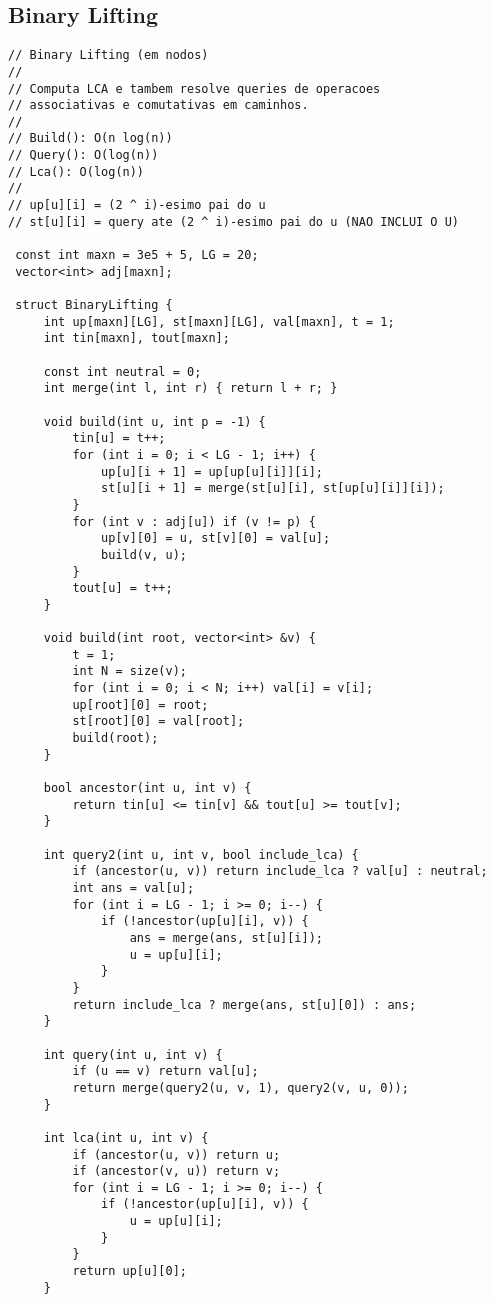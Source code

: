 \documentclass[11pt, a4paper, twoside]{article}
\begin{document}
\subsection{Binary Lifting}
\begin{lstlisting}
// Binary Lifting (em nodos)
//
// Computa LCA e tambem resolve queries de operacoes
// associativas e comutativas em caminhos.
//
// Build(): O(n log(n))
// Query(): O(log(n))
// Lca(): O(log(n))
//
// up[u][i] = (2 ^ i)-esimo pai do u
// st[u][i] = query ate (2 ^ i)-esimo pai do u (NAO INCLUI O U)

 const int maxn = 3e5 + 5, LG = 20;
 vector<int> adj[maxn];
 
 struct BinaryLifting {
     int up[maxn][LG], st[maxn][LG], val[maxn], t = 1;
     int tin[maxn], tout[maxn];
 
     const int neutral = 0;
     int merge(int l, int r) { return l + r; }
 
     void build(int u, int p = -1) {
         tin[u] = t++;
         for (int i = 0; i < LG - 1; i++) {
             up[u][i + 1] = up[up[u][i]][i];
             st[u][i + 1] = merge(st[u][i], st[up[u][i]][i]);
         }
         for (int v : adj[u]) if (v != p) {
             up[v][0] = u, st[v][0] = val[u];
             build(v, u);
         }
         tout[u] = t++;
     }
 
     void build(int root, vector<int> &v) {
         t = 1;
         int N = size(v);
         for (int i = 0; i < N; i++) val[i] = v[i];
         up[root][0] = root;
         st[root][0] = val[root];
         build(root);
     }
 
     bool ancestor(int u, int v) {
         return tin[u] <= tin[v] && tout[u] >= tout[v];
     }
 
     int query2(int u, int v, bool include_lca) {
         if (ancestor(u, v)) return include_lca ? val[u] : neutral;
         int ans = val[u];
         for (int i = LG - 1; i >= 0; i--) {
             if (!ancestor(up[u][i], v)) {
                 ans = merge(ans, st[u][i]);
                 u = up[u][i];
             }
         }
         return include_lca ? merge(ans, st[u][0]) : ans;
     }
 
     int query(int u, int v) { 
         if (u == v) return val[u];
         return merge(query2(u, v, 1), query2(v, u, 0));
     }
 
     int lca(int u, int v) {
         if (ancestor(u, v)) return u;
         if (ancestor(v, u)) return v;
         for (int i = LG - 1; i >= 0; i--) {
             if (!ancestor(up[u][i], v)) {
                 u = up[u][i];
             }
         }
         return up[u][0];
     }
 

\end{lstlisting}
\end{document}
